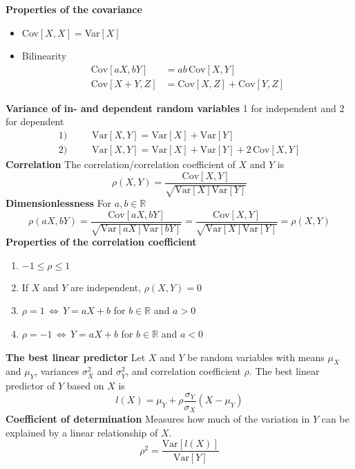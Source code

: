 \documentclass[12pt,a4paper,draft]{report}
\begin{document}
\textbf{Properties of the covariance}
\begin{itemize}
\item Cov$[X,X]=$Var$[X]$
\item Bilinearity
\begin{align*}
\text{Cov}[aX,bY]&=ab\, \text{Cov}[X,Y]\\
\text{Cov}[X+Y,Z]&=\text{Cov}[X,Z]+\text{Cov}[Y,Z]
\end{align*}
\end{itemize}
\textbf{Variance of in- and dependent random variables} 1 for independent and 2 for dependent
\begin{align*}
\text{1)}\phantom{mm}&\text{Var}[X,Y]=\text{Var}[X]+\text{Var}[Y]\\
\text{2)}\phantom{mm}&\text{Var}[X,Y]=\text{Var}[X]+\text{Var}[Y]+2\,\text{Cov}[X,Y]
\end{align*}
\textbf{Correlation} The correlation/correlation coefficient of $X$ and $Y$ is
\begin{equation}
\rho(X,Y)=\frac{\text{Cov}[X,Y]}{\sqrt{\text{Var}[X]\text{Var}[Y]}}
\end{equation}
\textbf{Dimensionlessness}
For $a,b\in\mathbb{R}$
\begin{equation}
\rho(aX,bY)=\frac{\text{Cov}[aX,bY]}{\sqrt{\text{Var}[aX]\text{Var}[bY]}}=\frac{\text{Cov}[X,Y]}{\sqrt{\text{Var}[X]\text{Var}[Y]}}=\rho(X,Y)
\end{equation}
\textbf{Properties of the correlation coefficient}
\begin{enumerate}
\setlength\itemsep{0em}
\item $-1\leq\rho\leq1$
\item If $X$ and $Y$ are independent, $\rho(X,Y)=0$
\item $\rho=1\,\Leftrightarrow\,Y=aX+b$ for $b\in\mathbb{R}$ and $a>0$
\item $\rho=-1\,\Leftrightarrow\,Y=aX+b$ for $b\in\mathbb{R}$ and $a<0$
\end{enumerate}
\textbf{The best linear predictor} Let $X$ and $Y$ be random variables with means $\mu_X$ and $\mu_Y$, variances $\sigma_X^2$ and $\sigma_Y^2$, and correlation coefficient $\rho$. The best linear predictor of $Y$ based on $X$ is
\begin{equation}
l(X)=\mu_Y+\rho\frac{\sigma_Y}{\sigma_X}(X-\mu_Y)
\end{equation}
\textbf{Coefficient of determination} Measures how much of the variation in $Y$ can be explained by a linear relationship of $X$.
\begin{equation}
\rho^2=\frac{\text{Var}[l(X)]}{\text{Var}[Y]}
\end{equation}
\end{document}
